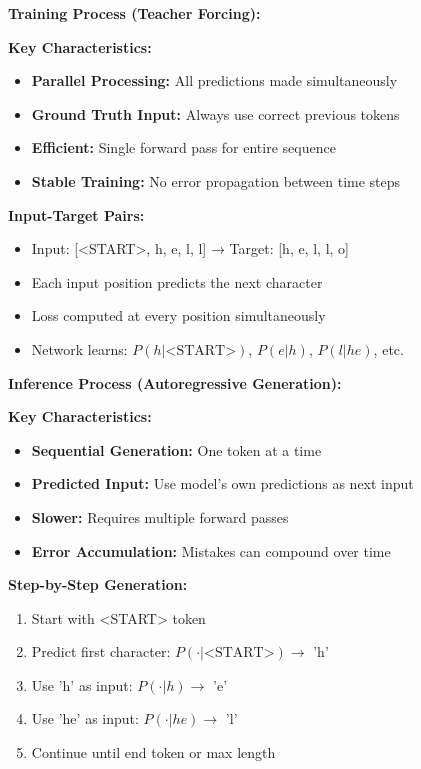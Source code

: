 \documentclass[12pt]{article}
\newcommand{\explanation}[1]{{\color{explanationcolor}#1}}
\begin{document}
\begin{enumerate}[(a)]
    \explanation{
    \textbf{Training Process (Teacher Forcing):}
    
    \textbf{Key Characteristics:}
    \begin{itemize}
        \item \textbf{Parallel Processing:} All predictions made simultaneously
        \item \textbf{Ground Truth Input:} Always use correct previous tokens
        \item \textbf{Efficient:} Single forward pass for entire sequence
        \item \textbf{Stable Training:} No error propagation between time steps
    \end{itemize}
    
    \textbf{Input-Target Pairs:}
    \begin{itemize}
        \item Input: [<START>, h, e, l, l] → Target: [h, e, l, l, o]
        \item Each input position predicts the next character
        \item Loss computed at every position simultaneously
        \item Network learns: $P(h|\text{<START>})$, $P(e|h)$, $P(l|he)$, etc.
    \end{itemize}
    
    \textbf{Inference Process (Autoregressive Generation):}
    
    \textbf{Key Characteristics:}
    \begin{itemize}
        \item \textbf{Sequential Generation:} One token at a time
        \item \textbf{Predicted Input:} Use model's own predictions as next input
        \item \textbf{Slower:} Requires multiple forward passes
        \item \textbf{Error Accumulation:} Mistakes can compound over time
    \end{itemize}
    
    \textbf{Step-by-Step Generation:}
    \begin{enumerate}
        \item Start with <START> token
        \item Predict first character: $P(\cdot|\text{<START>}) \rightarrow$ 'h'
        \item Use 'h' as input: $P(\cdot|h) \rightarrow$ 'e'
        \item Use 'he' as input: $P(\cdot|he) \rightarrow$ 'l'
        \item Continue until end token or max length
    \end{enumerate}
    
}
\end{enumerate}
\end{document}

